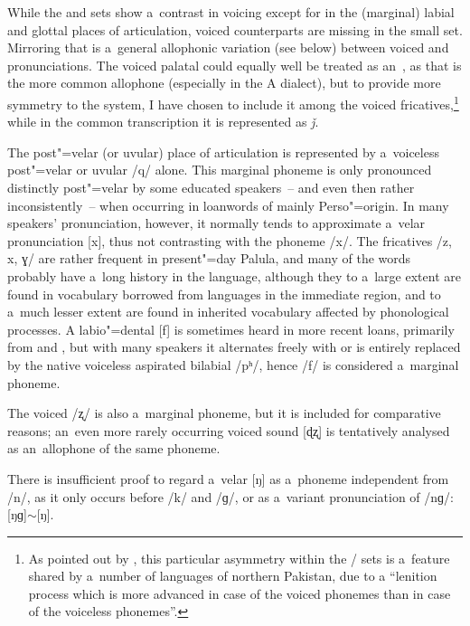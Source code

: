 While the  and  sets show a~contrast in voicing except for in the (marginal) labial and glottal places of articulation, voiced counterparts are missing in the small  set. Mirroring that is a~general allophonic variation (see below) between voiced  and  pronunciations. The voiced palatal  could equally well be treated as an~, as that is the more common allophone (especially in the A dialect), but to provide more symmetry to the system, I have chosen to include it among the voiced fricatives,\footnote{As pointed out by \citet[34]{zoller2005}, this particular asymmetry within the / sets is a~feature shared by a~number of languages of northern Pakistan, due to a ``lenition process which is more advanced in case of the voiced phonemes than in case of the voiceless phonemes''.} while in the common transcription it is represented as \textit{ǰ}.


The post"=velar (or uvular) place of articulation is represented by a~voiceless post"=velar or uvular  /q/ alone. This marginal phoneme is only pronounced distinctly post"=velar by some educated speakers~-- and even then rather inconsistently~-- when occurring in loanwords of mainly Perso"=\iliArabic origin. In many speakers' pronunciation, however, it normally tends to approximate a~velar  pronunciation [x], thus not contrasting with the phoneme /x/. The fricatives /z, x, ɣ/ are rather frequent in present"=day Palula, and many of the words probably have a~long history in the language, although they to a~large extent are found in vocabulary borrowed from languages in the immediate region, and to a~much lesser extent are found in inherited vocabulary affected by phonological processes. A labio"=dental [f] is sometimes heard in more recent loans, primarily from \iliUrdu and \iliEnglish, but with many speakers it alternates freely with or is entirely replaced by the native voiceless aspirated bilabial  /pʰ/, hence /f/ is considered a~marginal phoneme. 


The voiced   /ʐ/ is also a~marginal phoneme, but it is included for comparative reasons; an~even more rarely occurring voiced   sound [ɖʐ] is tentatively analysed as an~allophone of the same phoneme. 


There is insufficient proof to regard a~velar  [ŋ] as a~phoneme independent from /n/, as it only occurs before /k/ and /ɡ/, or as a~variant pronunciation of /nɡ/: [ŋɡ]$\sim$[ŋ]. 


